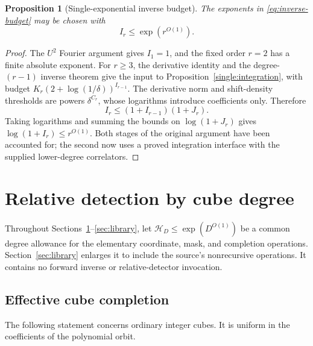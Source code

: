 \documentclass[11pt,a4paper]{article}
\newtheorem{proposition}[theorem]{Proposition}
\theoremstyle{definition}
\begin{document}
\begin{proposition}[Single-exponential inverse budget]\label{prop:inverse}
The exponents in \eqref{eq:inverse-budget} may be chosen with
\[
 I_r\le\exp(r^{O(1)}).
\]
\end{proposition}

\begin{proof}
The \(U^2\) Fourier argument gives \(I_1=1\), and the fixed
order \(r=2\) has a finite absolute exponent. For \(r\ge3\),
the derivative identity and the degree-\((r-1)\) inverse theorem
give the input to Proposition~\ref{single:integration}, with budget
\(K_r(2+\log(1/\delta))^{I_{r-1}}\). The derivative norm and
shift-density thresholds are powers \(\delta^{C_r}\), whose
logarithms introduce coefficients only. Therefore
\[
 I_r\le(1+I_{r-1})(1+J_r).
\]
Taking logarithms and summing the bounds on \(\log(1+J_r)\)
gives \(\log(1+I_r)\le r^{O(1)}\). Both stages of the original
argument have been accounted for; the second now uses a proved
integration interface with the supplied lower-degree correlators.
\end{proof}

\section{Relative detection by cube degree}\label{sec:relative}

Throughout Sections~\ref{sec:relative}--\ref{sec:library}, let
\(\mathcal H_D\le\exp(D^{O(1)})\) be a common degree
allowance for the elementary coordinate, mask, and completion
operations. Section~\ref{sec:library} enlarges it to include the
source's nonrecursive operations. It contains no forward inverse
or relative-detector invocation.

\subsection{Effective cube completion}\label{single:completion-section}

The following statement concerns ordinary integer cubes.  It is uniform
in the coefficients of the polynomial orbit.
\end{document}
